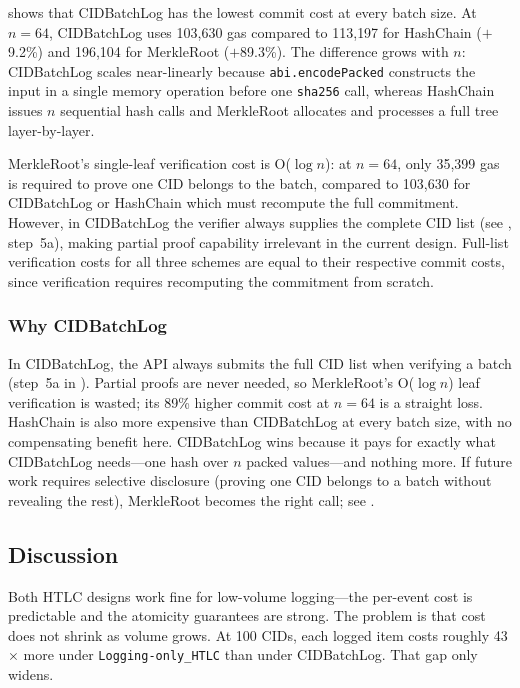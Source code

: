 \documentclass{svproc}
\def\ours{\xspace{CIDBatchLog}\xspace}
\begin{document}
 shows that CIDBatchLog has the lowest commit cost at every batch size. At $n=64$, CIDBatchLog uses 103{,}630 gas compared to 113{,}197 for HashChain ($+$9.2\%) and 196{,}104 for MerkleRoot ($+$89.3\%). The difference grows with $n$: CIDBatchLog scales near-linearly because \texttt{abi.encodePacked} constructs the input in a single memory operation before one \texttt{sha256} call, whereas HashChain issues $n$ sequential hash calls and MerkleRoot allocates and processes a full tree layer-by-layer.

MerkleRoot's single-leaf verification cost is O($\log n$): at $n=64$, only 35{,}399 gas is required to prove one CID belongs to the batch, compared to 103{,}630 for CIDBatchLog or HashChain which must recompute the full commitment. However, in \ours the verifier always supplies the complete CID list (see , step~5a), making partial proof capability irrelevant in the current design. Full-list verification costs for all three schemes are equal to their respective commit costs, since verification requires recomputing the commitment from scratch.

\subsubsection{Why CIDBatchLog}
In \ours, the API always submits the full CID list when verifying a batch (step~5a in ). Partial proofs are never needed, so MerkleRoot's O($\log n$) leaf verification is wasted; its 89\% higher commit cost at $n=64$ is a straight loss. HashChain is also more expensive than CIDBatchLog at every batch size, with no compensating benefit here. CIDBatchLog wins because it pays for exactly what \ours needs---one hash over $n$ packed values---and nothing more. If future work requires selective disclosure (proving one CID belongs to a batch without revealing the rest), MerkleRoot becomes the right call; see .

\subsection{Discussion}

Both HTLC designs work fine for low-volume logging---the per-event cost is predictable and the atomicity guarantees are strong. The problem is that cost does not shrink as volume grows. At 100 CIDs, each logged item costs roughly 43$\times$ more under \texttt{Logging-only\_HTLC} than under \ours. That gap only widens.
\end{document}
